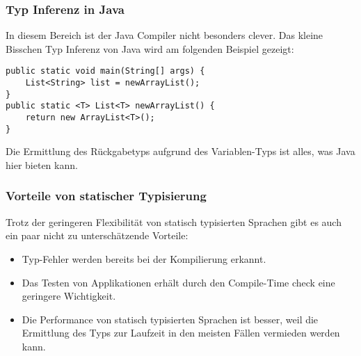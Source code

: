 \subsubsection{Typ Inferenz in Java}
In diesem Bereich ist der Java Compiler nicht besonders clever. Das kleine Bisschen Typ Inferenz von Java wird am folgenden Beispiel gezeigt:

\begin{lstlisting}[caption=Typ Inferenz in Java]
public static void main(String[] args) {
	List<String> list = newArrayList();
}
public static <T> List<T> newArrayList() {
	return new ArrayList<T>();
}
\end{lstlisting}
Die Ermittlung des R\"uckgabetyps aufgrund des Variablen-Typs ist alles, was Java hier bieten kann.

\subsubsection{Vorteile von statischer Typisierung}
Trotz der geringeren Flexibilit\"at von statisch typisierten Sprachen gibt es auch ein paar nicht zu untersch\"atzende Vorteile:

\begin{itemize}
\item Typ-Fehler werden bereits bei der Kompilierung erkannt.
\item Das Testen von Applikationen erh\"alt durch den Compile-Time check eine geringere Wichtigkeit. 
\item Die Performance von statisch typisierten Sprachen ist besser, weil die Ermittlung des Typs zur Laufzeit in den meisten F\"allen vermieden werden kann.
\end{itemize}

